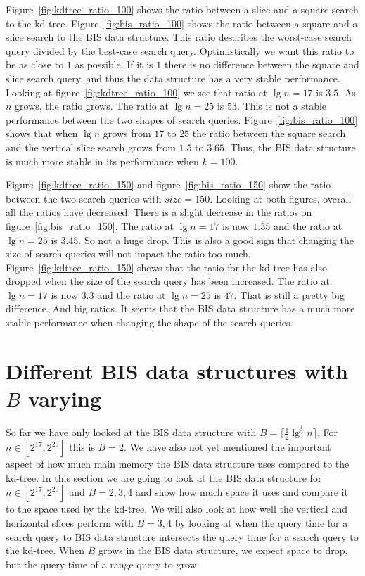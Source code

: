   Figure~\ref{fig:kdtree_ratio_100} shows the ratio between a slice and a square search to the kd-tree. Figure~\ref{fig:bis_ratio_100} shows the ratio between a square and a slice search to the BIS data structure. This ratio describes the worst-case search query divided by the best-case search query. Optimistically we want this ratio to be as close to $1$ as possible. If it is $1$ there is no difference between the square and slice search query, and thus the data structure has a very stable performance. Looking at figure~\ref{fig:kdtree_ratio_100} we see that ratio at $\lg n = 17$ is $3.5$. As $n$ grows, the ratio grows. The ratio at $\lg n = 25$ is $53$. This is not a stable performance between the two shapes of search queries. Figure~\ref{fig:bis_ratio_100} shows that when $\lg n$ grows from $17$ to $25$ the ratio between the square search and the vertical slice search grows from $1.5$ to $3.65$. Thus, the BIS data structure is much more stable in its performance when $k = 100$.

  Figure~\ref{fig:kdtree_ratio_150} and figure~\ref{fig:bis_ratio_150} show the ratio between the two search queries with $size = 150$. Looking at both figures, overall all the ratios have decreased. There is a slight decrease in the ratios on figure~\ref{fig:bis_ratio_150}. The ratio at $\lg n = 17$ is now $1.35$ and the ratio at $\lg n = 25$ is $3.45$. So not a huge drop. This is also a good sign that changing the size of search queries will not impact the ratio too much. Figure~\ref{fig:kdtree_ratio_150} shows that the ratio for the kd-tree has also dropped when the size of the search query has been increased. The ratio at $\lg n = 17$ is now $3.3$ and the ratio at $\lg n = 25$ is $47$. That is still a pretty big difference. And big ratios. It seems that the BIS data structure has a much more stable performance when changing the shape of the search queries.



 

\section{Different BIS data structures with $B$ varying}

So far we have only looked at the BIS data structure with $B = \lceil \frac{1}{2}\lg^{\frac{1}{3}} n \rceil$. For $n \in [2^{17}, 2^{25}]$ this is $B=2$. We have also not yet mentioned the important aspect of how much main memory the BIS data structure uses compared to the kd-tree. In this section we are going to look at the BIS data structure for $n \in [2^{17}, 2^{25}]$ and $B={2,3,4}$ and show how much space it uses and compare it to the space used by the kd-tree. We will also look at how well the vertical and horizontal slices perform with $B={3,4}$ by looking at when the query time for a search query to BIS data structure intersects the query time for a search query to the kd-tree. When $B$ grows in the BIS data structure, we expect space to drop, but the query time of a range query to grow.


